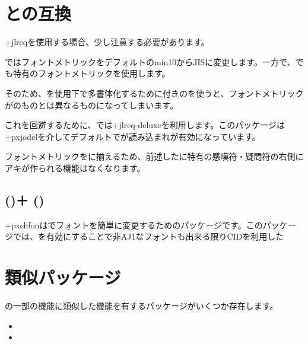 \documentclass[../supplement]{subfiles}
\begin{document}
\section{\texorpdfstring{}{jlreq文書クラス}との互換}

\cls+{jlreq}を使用する場合、少し注意する必要があります。

ではフォントメトリックを{\pLaTeX}デフォルトのmin10からJISに変更します。一方で、でも特有のフォントメトリックを使用します。

そのため、を使用下で多書体化するために付きのを使うと、フォントメトリックがのものとは異なるものになってしまいます。

これを回避するために、では\pkg+{jlreq-deluxe}を利用します。このパッケージは\pkg+{pxjodel}を介してデフォルトでが読み込まれが有効になっています。


フォントメトリックをに揃えるため、前述したに特有の感嘆符・疑問符の右側にアキが作られる機能はなくなります。

\subsection{\texorpdfstring{ ()＋ ()}{jlreq (deluxe)＋pxchfon (unicode)}}

\pkg+{pxchfon}は{\upLaTeX*}でフォントを簡単に変更するためのパッケージです。このパッケージでは、を有効にすることで非AJ1なフォントも出来る限りCIDを利用した

\section{類似パッケージ}

の一部の機能に類似した機能を有するパッケージがいくつか存在します。

\begin{itemize}
  \item {}
  \item {}
\end{itemize}
\end{document}
